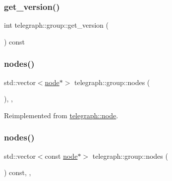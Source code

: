 \subsubsection{\texorpdfstring{get\+\_\+version()}{get\_version()}}
{\footnotesize\ttfamily int telegraph\+::group\+::get\+\_\+version (\begin{DoxyParamCaption}{ }\end{DoxyParamCaption}) const\hspace{0.3cm}{\ttfamily [inline]}}

\mbox{\label{classtelegraph_1_1group_a120c05f05d045fe4b5719b4abe4e83d9}} 
\subsubsection{\texorpdfstring{nodes()}{nodes()}\hspace{0.1cm}{\footnotesize\ttfamily [1/2]}}
{\footnotesize\ttfamily std\+::vector$<$\hyperlink{classtelegraph_1_1node}{node}$\ast$$>$ telegraph\+::group\+::nodes (\begin{DoxyParamCaption}{ }\end{DoxyParamCaption})\hspace{0.3cm}{\ttfamily [inline]}, {\ttfamily [override]}, {\ttfamily [virtual]}}



Reimplemented from \hyperlink{classtelegraph_1_1node_a14eb2051c1efaf4de6684d3e50aebeb7}{telegraph\+::node}.

\mbox{\label{classtelegraph_1_1group_ad5a82543eef530a7b07ca2cdbe6a82f5}} 
\subsubsection{\texorpdfstring{nodes()}{nodes()}\hspace{0.1cm}{\footnotesize\ttfamily [2/2]}}
{\footnotesize\ttfamily std\+::vector$<$const \hyperlink{classtelegraph_1_1node}{node}$\ast$$>$ telegraph\+::group\+::nodes (\begin{DoxyParamCaption}{ }\end{DoxyParamCaption}) const\hspace{0.3cm}{\ttfamily [inline]}, {\ttfamily [override]}, {\ttfamily [virtual]}}



